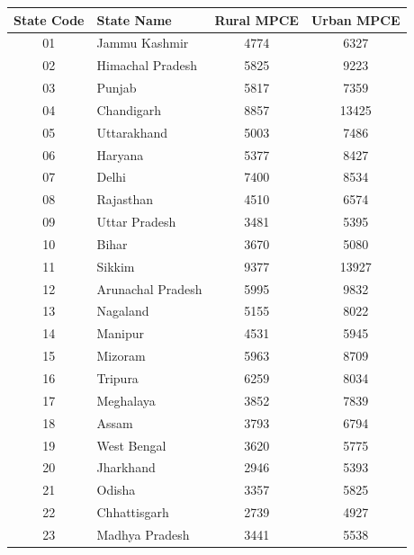 \documentclass{article}
\begin{document}
	
	\begin{longtable}{|c|l|c|c|}
		\hline
		\textbf{State Code} & \textbf{State Name} & \textbf{Rural MPCE} & \textbf{Urban MPCE} \\ \hline
		\endhead
		
		01  & Jammu  Kashmir              & 4774  & 6327 \\ \hline
		02  & Himachal Pradesh             & 5825  & 9223 \\ \hline
		03  & Punjab                       & 5817  & 7359 \\ \hline
		04  & Chandigarh                   & 8857  & 13425 \\ \hline
		05  & Uttarakhand                  & 5003  & 7486 \\ \hline
		06  & Haryana                      & 5377  & 8427 \\ \hline
		07  & Delhi                        & 7400  & 8534 \\ \hline
		08  & Rajasthan                    & 4510  & 6574 \\ \hline
		09  & Uttar Pradesh                & 3481  & 5395 \\ \hline
		10  & Bihar                        & 3670  & 5080 \\ \hline
		11  & Sikkim                       & 9377  & 13927 \\ \hline
		12  & Arunachal Pradesh            & 5995  & 9832 \\ \hline
		13  & Nagaland                     & 5155  & 8022 \\ \hline
		14  & Manipur                      & 4531  & 5945 \\ \hline
		15  & Mizoram                      & 5963  & 8709 \\ \hline
		16  & Tripura                      & 6259  & 8034 \\ \hline
		17  & Meghalaya                    & 3852  & 7839 \\ \hline
		18  & Assam                        & 3793  & 6794 \\ \hline
		19  & West Bengal                  & 3620  & 5775 \\ \hline
		20  & Jharkhand                    & 2946  & 5393 \\ \hline
		21  & Odisha                       & 3357  & 5825 \\ \hline
		22  & Chhattisgarh                 & 2739  & 4927 \\ \hline
		23  & Madhya Pradesh               & 3441  & 5538 \\ \hline

\end{longtable}
\end{document}
